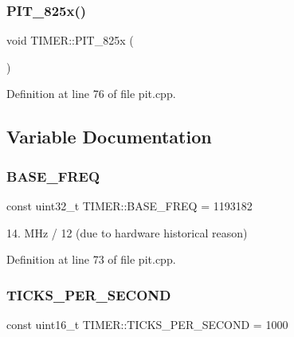 \subsubsection{\texorpdfstring{P\+I\+T\+\_\+825x()}{PIT\_825x()}}
{\footnotesize\ttfamily void T\+I\+M\+E\+R\+::\+P\+I\+T\+\_\+825x (\begin{DoxyParamCaption}{ }\end{DoxyParamCaption})}



Definition at line 76 of file pit.\+cpp.



\subsection{Variable Documentation}
\mbox{\label{namespace_t_i_m_e_r_a5e00501463f93ce13bbbc8b9798cdc2c}} 
\subsubsection{\texorpdfstring{B\+A\+S\+E\+\_\+\+F\+R\+EQ}{BASE\_FREQ}}
{\footnotesize\ttfamily const uint32\+\_\+t T\+I\+M\+E\+R\+::\+B\+A\+S\+E\+\_\+\+F\+R\+EQ = 1\textquotesingle{}193\textquotesingle{}182}



14. M\+Hz / 12 (due to hardware historical reason) 



Definition at line 73 of file pit.\+cpp.

\mbox{\label{namespace_t_i_m_e_r_aae36b4824645d9f2f506cd1199817117}} 
\subsubsection{\texorpdfstring{T\+I\+C\+K\+S\+\_\+\+P\+E\+R\+\_\+\+S\+E\+C\+O\+ND}{TICKS\_PER\_SECOND}}
{\footnotesize\ttfamily const uint16\+\_\+t T\+I\+M\+E\+R\+::\+T\+I\+C\+K\+S\+\_\+\+P\+E\+R\+\_\+\+S\+E\+C\+O\+ND = 1\textquotesingle{}000}



